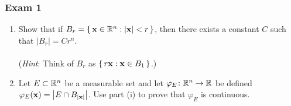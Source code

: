 \subsubsection{Exam 1}
\setcounter{exercise}{0}


\begin{problem}
\end{problem}
\begin{solution}
\end{solution}

\begin{problem}
\end{problem}
\begin{solution}
\end{solution}

\begin{problem}
\hfill
\begin{enumerate}[label=(\roman*),noitemsep]
\item Show that if $B_r=\left\{\,\mathbf{x}\in\mathbb{R}^n:|\mathbf{x}|<r\,\right\}$,
  then there exists a constant $C$ such that $|B_r|=Cr^n$.
\\\\
(\emph{Hint}: Think of $B_r$ as $\left\{\,r\mathbf{x}:\mathbf{x}\in B_1\,\right\}$.)
\item Let $E\subset\mathbb{R}^n$ be a measurable set and let
  $\varphi_E\colon\mathbb{R}^n\to\mathbb{R}$ be defined
  $\varphi_E(\mathbf{x})=\left|E\cap B_{|\mathbf{x}|}\right|$. Use part (i) to prove
    that $\varphi_E$ is continuous.
\end{enumerate}
\end{problem}
